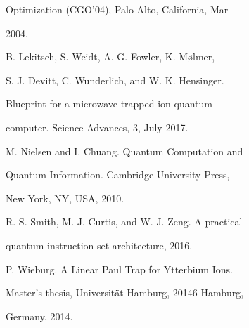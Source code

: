 \documentclass[a4paper,portrait,12pt]{article}
\begin{document}
\begin{flushleft}
Optimization (CGO'04), Palo Alto, California, Mar
\end{flushleft}


2004.


\begin{flushleft}
[5] B. Lekitsch, S. Weidt, A. G. Fowler, K. M{\o}lmer,
\end{flushleft}


\begin{flushleft}
S. J. Devitt, C. Wunderlich, and W. K. Hensinger.
\end{flushleft}


\begin{flushleft}
Blueprint for a microwave trapped ion quantum
\end{flushleft}


\begin{flushleft}
computer. Science Advances, 3, July 2017.
\end{flushleft}


\begin{flushleft}
[6] M. Nielsen and I. Chuang. Quantum Computation and
\end{flushleft}


\begin{flushleft}
Quantum Information. Cambridge University Press,
\end{flushleft}


\begin{flushleft}
New York, NY, USA, 2010.
\end{flushleft}


\begin{flushleft}
[7] R. S. Smith, M. J. Curtis, and W. J. Zeng. A practical
\end{flushleft}


\begin{flushleft}
quantum instruction set architecture, 2016.
\end{flushleft}


\begin{flushleft}
[8] P. Wieburg. A Linear Paul Trap for Ytterbium Ions.
\end{flushleft}


\begin{flushleft}
Master's thesis, Universität Hamburg, 20146 Hamburg,
\end{flushleft}


\begin{flushleft}
Germany, 2014.
\end{flushleft}





\newpage
\end{document}
